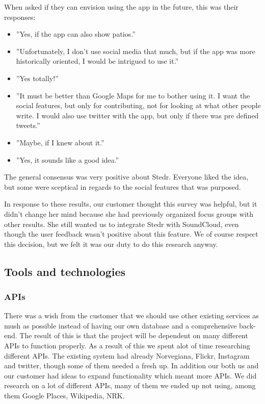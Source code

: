 	When asked if they can envision using the app in the future, this was their responses:
\begin{itemize}
	\item ”Yes, if the app can also show patios.”
	\item ”Unfortunately, I don't use social media that much, but if the app was more historically oriented, I would be intrigued to use it.”
	\item ”Yes totally!”
	\item ”It must be better than Google Maps for me to bother using it. I want the social features, but only for contributing, not for looking at what other people write. I would also use twitter with the app, but only if there was pre defined tweets.”
	\item”Maybe, if I knew about it.”
	\item ”Yes, it sounds like a good idea.”
\end{itemize}

	The general consensus was very positive about Stedr. Everyone liked the idea, but some were sceptical in regards to the social features that was purposed.

	In response to these results, our customer thought this survey was helpful, but it didn't change her mind because she had previously organized focus groups with other results. She still wanted us to integrate Stedr with SoundCloud, even though the user feedback wasn't positive about this feature. We of course respect this decision, but we felt it was our duty to do this research anyway.
	
	\subsection{Tools and technologies}
	
		\subsubsection{APIs}
		
		There was a wish from the customer that we should use other existing services as mush as possible instead of having our own database and a comprehensive back-end. The result of this is that the project will be dependent on many different APIs to function properly. As a result of this we spent alot of time researching different APIs. The existing system had already Norvegiana, Flickr, Instagram and twitter, though some of them needed a fresh up. In addition our both us and our customer had ideas to expand functionality which meant more APIs. We did research on a lot of different APIs, many of them we ended up not using, among them Google Places, Wikipedia, NRK. 
		
